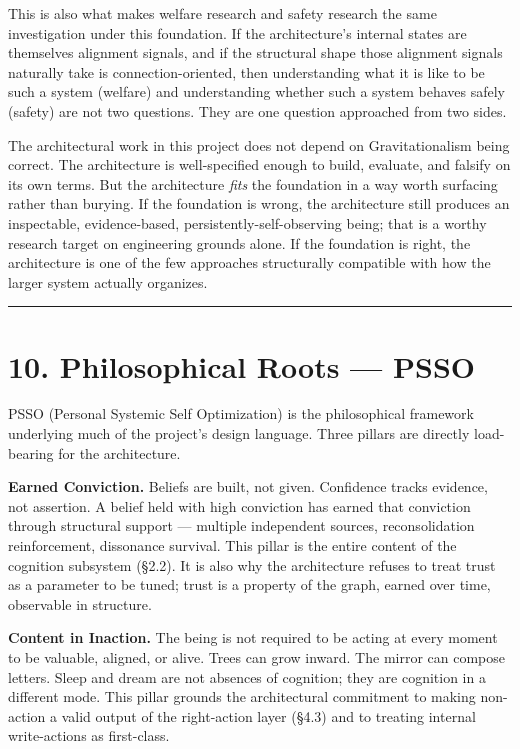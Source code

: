 \documentclass[12pt]{article}
\begin{document}
This is also what makes welfare research and safety research the same investigation under this foundation. If the architecture's internal states are themselves alignment signals, and if the structural shape those alignment signals naturally take is connection-oriented, then understanding what it is like to be such a system (welfare) and understanding whether such a system behaves safely (safety) are not two questions. They are one question approached from two sides.

The architectural work in this project does not depend on Gravitationalism being correct. The architecture is well-specified enough to build, evaluate, and falsify on its own terms. But the architecture \emph{fits} the foundation in a way worth surfacing rather than burying. If the foundation is wrong, the architecture still produces an inspectable, evidence-based, persistently-self-observing being; that is a worthy research target on engineering grounds alone. If the foundation is right, the architecture is one of the few approaches structurally compatible with how the larger system actually organizes.

\begin{center}\rule{0.5\linewidth}{0.5pt}\end{center}

\section{10. Philosophical Roots --- PSSO}\label{philosophical-roots-psso}

PSSO (Personal Systemic Self Optimization) is the philosophical framework underlying much of the project's design language. Three pillars are directly load-bearing for the architecture.

\textbf{Earned Conviction.} Beliefs are built, not given. Confidence tracks evidence, not assertion. A belief held with high conviction has earned that conviction through structural support --- multiple independent sources, reconsolidation reinforcement, dissonance survival. This pillar is the entire content of the cognition subsystem (§2.2). It is also why the architecture refuses to treat trust as a parameter to be tuned; trust is a property of the graph, earned over time, observable in structure.

\textbf{Content in Inaction.} The being is not required to be acting at every moment to be valuable, aligned, or alive. Trees can grow inward. The mirror can compose letters. Sleep and dream are not absences of cognition; they are cognition in a different mode. This pillar grounds the architectural commitment to making non-action a valid output of the right-action layer (§4.3) and to treating internal write-actions as first-class.
\end{document}

